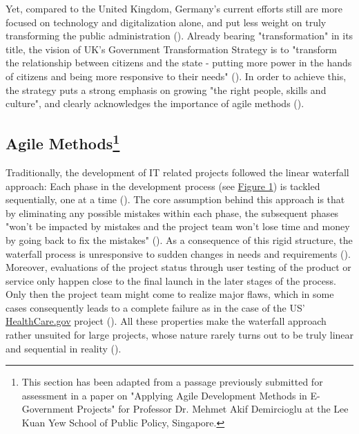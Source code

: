 Yet, compared to the United Kingdom, Germany's current efforts still are more focused on technology and digitalization alone, and put less weight on truly transforming the public administration (\cite{Mergel2019, EuropeanCommission2019b}). Already bearing "transformation" in its title, the vision of UK's Government Transformation Strategy is to "transform the relationship between citizens and the state - putting more power in the hands of citizens and being more responsive to their needs" (\cite{CabinetOffice2017}). In order to achieve this, the strategy puts a strong emphasis on growing "the right people, skills and culture", and clearly acknowledges the importance of agile methods (\cite{CabinetOffice2017}).\par 


\subsection[Agile Methods]{Agile Methods\footnote{This section has been adapted from a passage previously submitted for assessment in a paper on "Applying Agile Development Methods in E-Government Projects" for Professor Dr. Mehmet Akif Demircioglu at the Lee Kuan Yew School of Public Policy, Singapore.}}\label{Agile Methods}
\begin{wrapfigure}[8]{r}{0.5\textwidth}
	\centering
	\texttt{[image: \{"Latex/THESIS/Figures/Waterfall"]}.png}
	\caption[Waterfall development process]{Waterfall development process (adapted from \cite{Mergel2016})}
	\label{fig:Waterfall development}
\end{wrapfigure}
Traditionally, the development of IT related projects followed the linear waterfall approach: Each phase in the development process (see \hyperref[fig:Waterfall development]{Figure 1}) is tackled sequentially, one at a time (\cite{Kannan2014, Sherrell2013}). The core assumption behind this approach is that by eliminating any possible mistakes within each phase, the subsequent phases "won't be impacted by mistakes and the project team won't lose time and money by going back to fix the mistakes" (\cite[p. 517]{Mergel2016}). As a consequence of this rigid structure, the waterfall process is unresponsive to sudden changes in needs and requirements (\cite{Kannan2014}). Moreover, evaluations of the project status through user testing of the product or service only happen close to the final launch in the later stages of the process. Only then the project team might come to realize major flaws, which in some cases consequently leads to a complete failure as in the case of the US' \href{www.healthcare.gov}{HealthCare.gov} project (\cite{Mergel2016}). All these properties make the waterfall approach rather unsuited for large projects, whose nature rarely turns out to be truly linear and sequential in reality (\cite{Kannan2014}).

